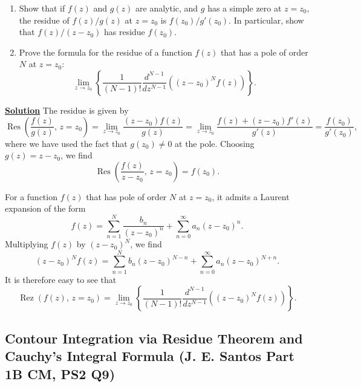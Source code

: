 \begin{enumerate}
  \item Show that if $f(z)$ and $g(z)$ are analytic, and $g$ has a simple zero
    at $z=z_0$, the residue of $f(z)/g(z)$ at $z=z_0$ is $f(z_0)/g'(z_0)$.
    In particular, show that $f(z)/(z-z_0)$ has residue $f(z_0)$.

  \item Prove the formula for the residue of a function $f(z)$ that has a pole
    of order $N$ at $z=z_0$:
    \begin{equation}
      \lim_{z\to z_0}\left\{
        \frac{1}{(N-1)!}\frac{d^{N-1}}{d z^{N-1}}
        \left((z-z_0)^N f(z)\right)
      \right\}.
    \end{equation}

\end{enumerate}

\noindent \underline{\textbf{Solution}} The residue is given by
\begin{equation}
    \operatorname{Res}\left(\frac{f(z)}{g(z)},\, z=z_0\right) = \lim_{z\to z_0}\frac{(z-z_0)f(z)}{g(z)} = \lim_{z\to z_0}\frac{f(z) + (z-z_0)f'(z)}{g'(z)}=\frac{f(z_0)}{g'(z_0)},
\end{equation}
where we have used the fact that $g(z_0)\neq0$ at the pole. Choosing $g(z) = z-z_0$, we find
\begin{equation}
    \operatorname{Res}\left(\frac{f(z)}{z-z_0},\, z=z_0\right) = f(z_0).
\end{equation}

For a function $f(z)$ that has  pole of order $N$ at $z=z_0$, it admits a Laurent expansion of the form
\begin{equation}
    f(z) = \sum_{n=1}^N\frac{b_n}{(z-z_0)^n} + \sum_{n=0}^\infty a_n(z-z_0)^n.
\end{equation}
Multiplying $f(z)$ by $(z-z_0)^N$, we find
\begin{equation}
    (z-z_0)^Nf(z) = \sum_{n=1}^N b_n (z-z_0)^{N-n} + \sum_{n=0}^\infty a_n(z-z_0)^{N+n}.
\end{equation}
It is therefore easy to see that
\begin{equation}
    \operatorname{Rez}\left(f(z), \, z=z_0\right) = \lim_{z\to z_0}\left\{
        \frac{1}{(N-1)!}\frac{d^{N-1}}{d z^{N-1}}
        \left((z-z_0)^N f(z)\right)
      \right\}.
\end{equation}

\subsection{Contour Integration via Residue Theorem and Cauchy’s Integral Formula (J. E. Santos Part 1B CM, PS2 Q9)}
\label{sec:contour_integration_cauchy}

